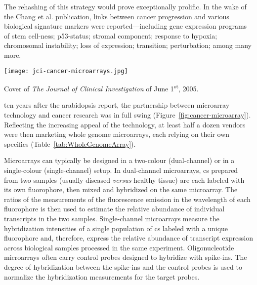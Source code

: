 The rehashing of this strategy would prove exceptionally prolific.  In the wake
of the Chang et al. publication, links between cancer progression and various
biological signature markers were reported---including gene expression programs
of stem
\mbox{cell-ness};\cite{glinsky_microarray_2005,ben-porath_embryonic_2008}
p53-status;\cite{miller_expression_2005} stromal
component;\cite{west_determination_2005} response to
hypoxia;\cite{chi_gene_2006} chromosomal
instability;\cite{carter_signature_2006,buffa_large_2010} loss of
\emph{} expression;\cite{saal_poor_2007} 
transition;\cite{welm_macrophage-stimulating_2007,taube_core_2010}
\emph{} perturbation;\cite{hallstrom_e2f1-dependent_2008}
among many more.

\medskip

\begin{marginfigure}%
  \texttt{[image: jci-cancer-microarrays.jpg]}
  \caption[Cover of \emph{The Journal of Clinical Investigation} of June
  1\textsuperscript{st}, 2005]{Cover of \emph{The Journal of Clinical
      Investigation} of June 1\textsuperscript{st}, 2005.}
  \label{fig:cancer-microarray}
\end{marginfigure}

 ten years after the arabidopsis report, the partnership
between microarray technology and cancer research was in full swing
(Figure~\ref{fig:cancer-microarray}).  Reflecting the increasing appeal of the
technology, at least half a dozen vendors were then marketing whole genome
microarrays, each relying on their own specifics
(Table~\ref{tab:WholeGenomeArray}).

Microarrays can typically be designed in a \mbox{two-colour}
(\mbox{dual-channel}) or in a \mbox{single-colour} (\mbox{single-channel})
setup.  In \mbox{dual-channel} microarrays, cs prepared from two
samples (usually diseased \emph{versus} healthy tissue) are each labeled with
its own fluorophore, then mixed and hybridized on the same microarray.  The
ratios of the measurements of the fluorescence emission in the wavelength of
each fluorophore is then used to estimate the relative abundance of individual
transcripts in the two samples.  \mbox{Single-channel} microarrays measure the
hybridization intensities of a single population of cs labeled
with a unique fluorophore and, therefore, express the relative abundance of
transcript expression across biological samples processed in the same
experiment.  Oligonucleotide microarrays often carry control probes designed to
hybridize with  \mbox{spike-ins}.  The degree of hybridization
between the \mbox{spike-ins} and the control probes is used to normalize the
hybridization measurements for the target probes.

